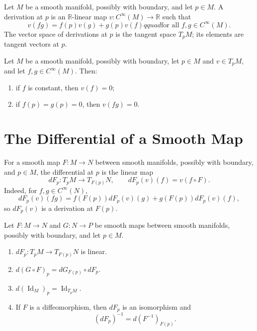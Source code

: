 \begin{definition}
\label{def:3-13-extra-3}



Let $M$ be a smooth manifold, possibly with boundary, and let $p\in M$. A
derivation at $p$ is an $\mathbb{R}$-linear map
$v:C^\infty(M)\to\mathbb{R}$ such that
\[
v(fg)=f(p)v(g)+g(p)v(f)qquad
\text{for all }f,g\in C^\infty(M). \tag{3.4}
\]
The vector space of derivations at $p$ is the tangent space $T_pM$; its
elements are tangent vectors at $p$.
\end{definition}

\begin{lemma}
\label{lem:3-4}




Let $M$ be a smooth manifold, possibly with boundary, let $p\in M$ and
$v\in T_pM$, and let $f,g\in C^\infty(M)$. Then:
\begin{enumerate}
\item if $f$ is constant, then $v(f)=0$;
\item if $f(p)=g(p)=0$, then $v(fg)=0$.
\end{enumerate}
\end{lemma}



\section{The Differential of a Smooth Map}

\begin{definition}
\label{def:3-14-extra-1}



For a smooth map $F:M\to N$ between smooth manifolds, possibly with boundary,
and $p\in M$, the differential at $p$ is the linear map
\[
dF_p:T_pM\longrightarrow T_{F(p)}N,
\qquad dF_p(v)(f)=v(f\circ F).
\]
Indeed, for $f,g\in C^\infty(N)$,
\[
dF_p(v)(fg)
=f(F(p))dF_p(v)(g)+g(F(p))dF_p(v)(f),
\]
so $dF_p(v)$ is a derivation at $F(p)$.
\end{definition}

\begin{proposition}
\label{prop:3-6}




Let $F:M\to N$ and $G:N\to P$ be smooth maps between smooth manifolds,
possibly with boundary, and let $p\in M$.
\begin{enumerate}
\item $dF_p:T_pM\to T_{F(p)}N$ is linear.
\item $d(G\circ F)_p=dG_{F(p)}\circ dF_p$.
\item $d(\operatorname{Id}_M)_p=\operatorname{Id}_{T_pM}$.
\item If $F$ is a diffeomorphism, then $dF_p$ is an isomorphism and
\[
(dF_p)^{-1}=d(F^{-1})_{F(p)}.
\]
\end{enumerate}
\end{proposition}


